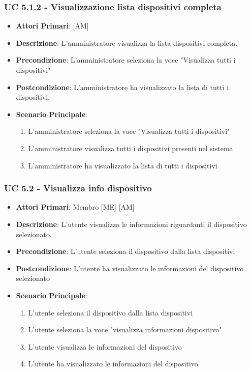 			\subsubsection{UC 5.1.2 - Visualizzazione lista dispositivi completa}
			\begin{itemize}
				\item \textbf{Attori Primari}: [AM]
				\item \textbf{Descrizione}: L'amministratore visualizza la lista dispositivi completa.
				\item \textbf{Precondizione}: L'amministratore seleziona la voce "Visualizza tutti i dispositivi"
				\item \textbf{Postcondizione}: L'amministratore ha visualizzato la lista di tutti i dispositivi.
				\item \textbf{Scenario Principale}:
				\begin{enumerate}
					\item{L'amministratore seleziona la voce "Visualizza tutti i dispositivi"}
					\item{L'amministratore visualizza tutti i dispositivi presenti nel sistema}
					\item{L'amministratore ha visualizzato la lista di tutti i dispositivi}
				\end{enumerate}
			\end{itemize}
			
			\subsubsection{UC 5.2 - Visualizza info dispositivo}
			\begin{itemize}
				\item \textbf{Attori Primari}: Membro [ME] [AM]
				\item \textbf{Descrizione}: L'utente visualizza le informazioni riguardanti il dispositivo selezionato.
				\item \textbf{Precondizione}: L'utente seleziona il dispositivo dalla lista dispositivi
				\item \textbf{Postcondizione}: L'utente ha visualizzato le informazioni del dispositivo selezionato
				\item \textbf{Scenario Principale}:
				\begin{enumerate}
					\item{L'utente seleziona il dispositivo dalla lista dispositivi}
					\item{L'utente seleziona la voce "visualizza informazioni dispositivo"}
					\item{L'utente visualizza le informazioni del dispositivo}
					\item{L'utente ha visualizzato le informazioni del dispositivo}
				\end{enumerate}
			\end{itemize}
			

